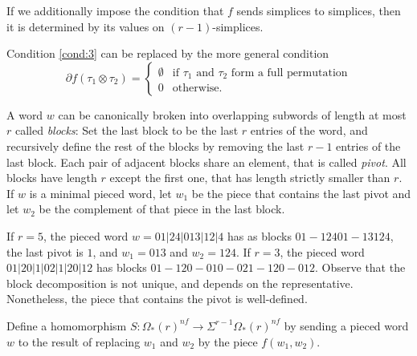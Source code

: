 \begin{remark}
	If we additionally impose the condition that $f$ sends simplices to simplices, then it is determined by its values on $(r-1)$-simplices.
\end{remark}

\begin{remark}
	Condition \eqref{cond:3} can be replaced by the more general condition
	\[
	\partial f(\tau_1\otimes\tau_2) =
	\begin{cases}
	\emptyset & \text{if $\tau_1$ and $\tau_2$ form a full permutation} \\
	0 & \text{otherwise}.
	\end{cases}
	\]
\end{remark}



A word $w$ can be canonically broken into overlapping subwords of length at most $r$ called \emph{blocks}: Set the last block to be the last $r$ entries of the word, and recursively define the rest of the blocks by removing the last $r-1$ entries of the last block. Each pair of adjacent blocks share an element, that is called \emph{pivot}. All blocks have length $r$ except the first one, that has length strictly smaller than $r$. If $w$ is a minimal pieced word, let $w_1$ be the piece that contains the last pivot and let $w_2$ be the complement of that piece in the last block.

\begin{example}
	If $r=5$, the pieced word $w=01|24|013|12|4$ has as blocks $01-12401-13124$, the last pivot is $1$, and $w_1 = 013$ and $w_2 = 124$. If $r=3$, the pieced word $01|20|1|02|1|20|12$ has blocks $01-120-010-021-120-012$. Observe that the block decomposition is not unique, and depends on the representative. Nonetheless, the piece that contains the pivot is well-defined.
\end{example}

\begin{definition}
	Define a homomorphism $S\colon \Omega_*(r)^{nf}\to \Sigma^{r-1}\Omega_*(r)^{nf}$ by sending a pieced word $w$ to the result of replacing $w_1$ and $w_2$ by the piece $f(w_1,w_2)$. %
\end{definition}


